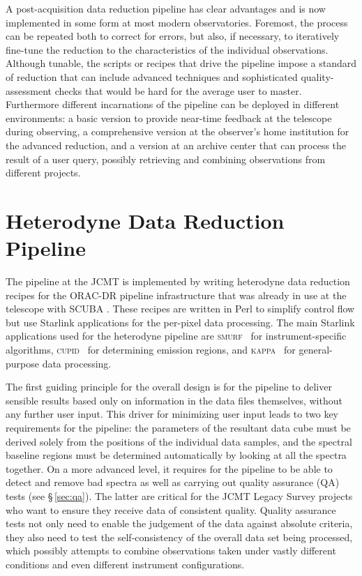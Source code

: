 \documentclass[a4paper,fleqn,usenatbib]{mnras}
\newcommand{\KAPPA}{\textsc{kappa}}
\newcommand{\cupid}{\textsc{cupid}}
\newcommand{\smurf}{\textsc{smurf}}
\newcommand{\ascl}[1]{\href{http://www.ascl.net/#1}{ascl:#1}}
\begin{document}
A post-acquisition data reduction pipeline has clear advantages and is
now implemented in some form at most modern observatories. Foremost,
the process can be repeated both to correct for errors, but also, if
necessary, to iteratively fine-tune the reduction to the
characteristics of the individual observations. Although tunable, the
scripts or recipes that drive the pipeline impose a standard of
reduction that can include advanced techniques and sophisticated
quality-assessment checks that would be hard for the average user to
master. Furthermore different incarnations of the pipeline can be
deployed in different environments: a basic version to provide
near-time feedback at the telescope during observing, a comprehensive
version at the observer's home institution for the advanced reduction,
and a version at an archive center that can process the result of a
user query, possibly retrieving and combining observations from
different projects.


\section{Heterodyne Data Reduction Pipeline}

The pipeline at the JCMT is implemented by writing heterodyne data
reduction recipes for the ORAC-DR pipeline infrastructure
\citep[][\ascl{1310.001}]{2011tfa..confE..42J,2015A&C.....9...40J}
that was already in use at the telescope with SCUBA
\citep[e.g.,][]{1999ASPC..172..171J}. These recipes are written in
Perl to simplify control flow but use Starlink applications \citep[see
e.g.,][]{2014ASPC..485..391C} for the per-pixel data processing. The
main Starlink applications used for the heterodyne pipeline are
\smurf\ \citep[][\ascl{1310.007}]{SUN258} for instrument-specific
algorithms, \cupid\ \citep[][\ascl{1311.007}]{2007ASPC..376..425B} for
determining emission regions, and \KAPPA\
\citep[][\ascl{1403.022}]{SUN95} for general-purpose data processing.

The first guiding principle for the overall
design is for the pipeline to deliver sensible results based only on
information in the data files themselves, without any further user
input. This driver for minimizing user input leads to two key requirements
for the pipeline: the parameters of the resultant data cube must be
derived solely from the positions of the individual data samples, and
the spectral baseline regions must be determined automatically by
looking at all the spectra together.
On a more advanced level, it requires for the pipeline to be
able to detect and remove bad spectra as well as carrying out quality
assurance (QA) tests (see \S\,\ref{sec:qa}). The latter are critical
for the JCMT Legacy Survey projects
\citep{2007PASP..119..855W,2009ApJ...693.1736W,2007PASP..119..102P}
who want to ensure they receive data of consistent quality.  Quality
assurance tests not only need to enable the judgement of the data against absolute
criteria, they also need to test the self-consistency of the overall
data set being processed, which possibly attempts to combine
observations taken under vastly different conditions and even
different instrument configurations.
\end{document}
